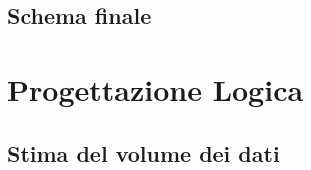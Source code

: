 \documentclass[a4paper, 12pt]{report}
\begin{document}
\section{Schema finale}

\chapter{Progettazione Logica}

\section{Stima del volume dei dati}
\end{document}

